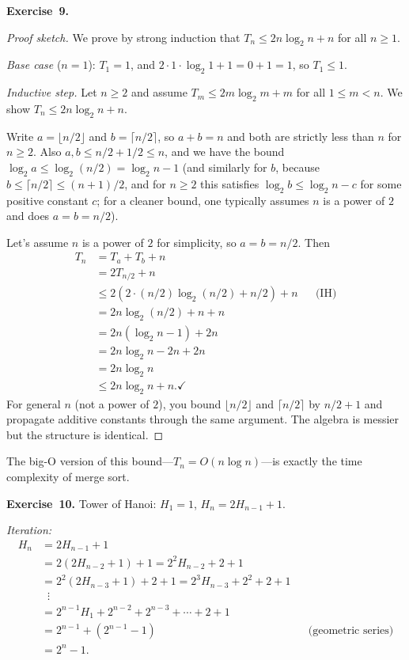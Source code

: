 \documentclass[11pt]{article}
\begin{document}
\medskip
\textbf{Exercise~9.}
\begin{proof}[Proof sketch]
We prove by strong induction that $T_n \leq 2 n \log_2 n + n$ for all $n \geq 1$.

\emph{Base case} ($n = 1$): $T_1 = 1$, and $2 \cdot 1 \cdot \log_2 1 + 1 = 0 + 1 = 1$, so $T_1 \leq 1$. \checkmark

\emph{Inductive step.} Let $n \geq 2$ and assume $T_m \leq 2 m \log_2 m + m$ for all $1 \leq m < n$. We show $T_n \leq 2 n \log_2 n + n$.

Write $a = \lfloor n/2 \rfloor$ and $b = \lceil n/2 \rceil$, so $a + b = n$ and both are strictly less than $n$ for $n \geq 2$. Also $a, b \leq n/2 + 1/2 \leq n$, and we have the bound $\log_2 a \leq \log_2(n/2) = \log_2 n - 1$ (and similarly for $b$, because $b \leq \lceil n/2 \rceil \leq (n+1)/2$, and for $n \geq 2$ this satisfies $\log_2 b \leq \log_2 n - c$ for some positive constant $c$; for a cleaner bound, one typically assumes $n$ is a power of $2$ and does $a = b = n/2$).

Let's assume $n$ is a power of $2$ for simplicity, so $a = b = n/2$. Then
\begin{align*}
  T_n &= T_a + T_b + n \\
      &= 2 T_{n/2} + n \\
      &\leq 2(2 \cdot (n/2) \log_2(n/2) + n/2) + n && \text{(IH)} \\
      &= 2 n \log_2(n/2) + n + n \\
      &= 2 n (\log_2 n - 1) + 2 n \\
      &= 2 n \log_2 n - 2 n + 2 n \\
      &= 2 n \log_2 n \\
      &\leq 2 n \log_2 n + n. \checkmark
\end{align*}
For general $n$ (not a power of $2$), you bound $\lfloor n/2 \rfloor$ and $\lceil n/2 \rceil$ by $n/2 + 1$ and propagate additive constants through the same argument. The algebra is messier but the structure is identical.
\end{proof}

The big-O version of this bound---$T_n = O(n \log n)$---is exactly the time complexity of merge sort.

\medskip
\textbf{Exercise~10.}
Tower of Hanoi: $H_1 = 1$, $H_n = 2 H_{n-1} + 1$.

\emph{Iteration:}
\begin{align*}
  H_n &= 2 H_{n-1} + 1 \\
      &= 2(2 H_{n-2} + 1) + 1 = 2^2 H_{n-2} + 2 + 1 \\
      &= 2^2 (2 H_{n-3} + 1) + 2 + 1 = 2^3 H_{n-3} + 2^2 + 2 + 1 \\
      &\;\;\vdots \\
      &= 2^{n-1} H_1 + 2^{n-2} + 2^{n-3} + \cdots + 2 + 1 \\
      &= 2^{n-1} + (2^{n-1} - 1) && \text{(geometric series)} \\
      &= 2^n - 1.
\end{align*}
\end{document}
